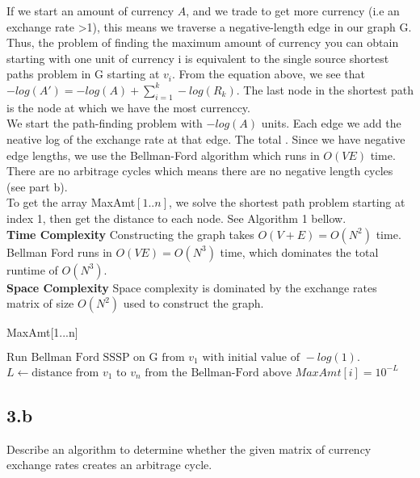 \documentclass[11pt]{article}
\begin{document}
\begin{solution}
If we start an amount of currency $A$, and we trade to get more currency (i.e an exchange rate >1), this means we traverse a negative-length edge in our graph G.  Thus, the problem of finding the maximum amount of currency you can obtain starting with one unit of currency i is equivalent to the single source shortest paths problem in G starting at $v_i$. From the equation above, we see that $-log(A')=-log(A)+\sum_{i=1}^{k} -log(R_k)$. The last node in the shortest path is the node at which we have the most currenccy. \\ 

We start the path-finding problem with $-log(A)$ units. Each edge we add the neative log of the exchange rate at that edge. The total . Since we have negative edge lengths, we use the Bellman-Ford algorithm which runs in $O(VE)$ time. There are no arbitrage cycles which means there are no negative length cycles (see part b).  \\

To get the array MaxAmt$[1..n]$, we solve the shortest path problem starting at index 1, then get the distance to each node. See Algorithm 1 bellow. \\

\textbf{Time Complexity}
Constructing the graph takes $O(V+E)=O(N^2)$ time.
Bellman Ford runs in $O(VE)=O(N^3)$ time, which dominates the total runtime of $O(N^3)$. \\

\textbf{Space Complexity} 
Space complexity is dominated by the exchange rates matrix of size $O(N^2)$ used to construct the graph.

\begin{algorithm}
\caption{MaxAmt[1...n]}
\begin{algorithmic}
\STATE $\text{Run Bellman Ford SSSP on G from }v_1 \text{ with initial value of } -log(1).$
\STATE $L \gets \text{distance from } v_1 \text{ to } v_n \text{ from the Bellman-Ford above}$
\STATE $MaxAmt[i] = 10^{-L}$
\ENDFOR
\end{algorithmic}
\end{algorithm} 


\end{solution}

\clearpage



\subsection *{3.b} Describe an algorithm to determine whether the given matrix of currency exchange rates creates an arbitrage cycle. 
\end{document}
